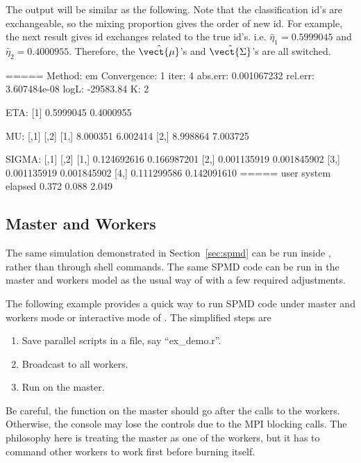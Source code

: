 The output will be similar as the following.
Note that the classification id's are exchangeable, so the mixing proportion
gives the order of new id. For example, the next result gives
id exchanges related to the true id's.
i.e. $\hat{\eta}_1 = 0.5999045$ and $\hat{\eta}_2 = 0.4000955$.
Therefore, the $\hat{\vect{\mu}}$'s and
$\hat{\vect{\Sigma}}$'s are all switched.
\begin{CodeOutput}
=====
Method: em
Convergence: 1  iter: 4  abs.err: 0.001067232  rel.err: 3.607484e-08
logL: -29583.84
K: 2

ETA:
[1] 0.5999045 0.4000955

MU:
         [,1]     [,2]
[1,] 8.000351 6.002414
[2,] 8.998864 7.003725

SIGMA:
            [,1]        [,2]
[1,] 0.124692616 0.166987201
[2,] 0.001135919 0.001845902
[3,] 0.001135919 0.001845902
[4,] 0.111299586 0.142091610
=====
   user  system elapsed
  0.372   0.088   2.049
\end{CodeOutput}


\subsection[Master and Workers]{Master and Workers}
\label{sec:master_workers}
The same simulation demonstrated in Section~\ref{sec:spmd} can be run
inside , rather than through shell commands.
The same SPMD code can be run in the master and workers model as the usual way
of  with a few required adjustments.

The following example provides a quick way to run SPMD code under master
and workers mode or interactive mode of . The simplified steps are 
\begin{enumerate}
\item Save parallel scripts in a file, say ``ex\_demo.r''.
\item Broadcast  to all workers.
\item Run  on the master.
\end{enumerate}
Be careful, the 
function on the master should go after the calls to
the workers. Otherwise, the  console may lose the controls due to
the MPI blocking calls.
The philosophy here is treating the master as one of the workers, but it
has to command other workers to work first before burning itself.

